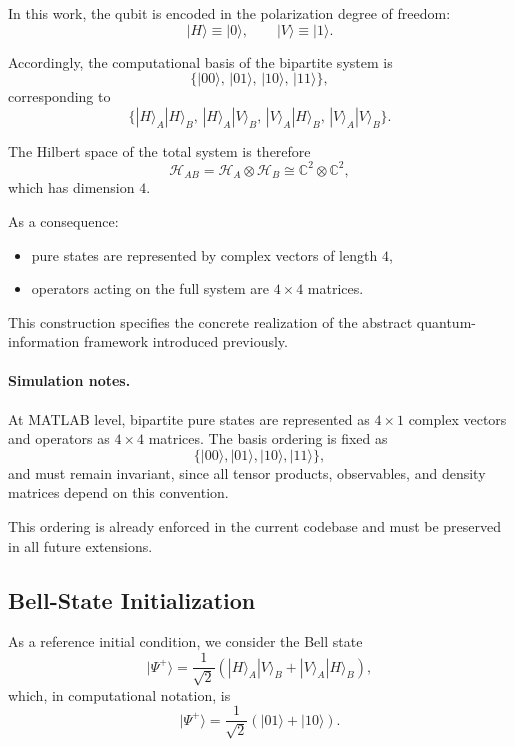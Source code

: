\documentclass[a4paper]{article}
\begin{document}
In this work, the qubit is encoded in the polarization degree of freedom:
\[
|H\rangle \equiv |0\rangle,
\qquad
|V\rangle \equiv |1\rangle.
\]

Accordingly, the computational basis of the bipartite system is
\[
\{
|00\rangle,\,
|01\rangle,\,
|10\rangle,\,
|11\rangle
\},
\]
corresponding to
\[
\{
|H\rangle_A |H\rangle_B,\,
|H\rangle_A |V\rangle_B,\,
|V\rangle_A |H\rangle_B,\,
|V\rangle_A |V\rangle_B
\}.
\]

The Hilbert space of the total system is therefore
\[
\mathcal{H}_{AB} = \mathcal{H}_A \otimes \mathcal{H}_B
\cong \mathbb{C}^2 \otimes \mathbb{C}^2,
\]
which has dimension \(4\).

As a consequence:
\begin{itemize}
    \item pure states are represented by complex vectors of length \(4\),
    \item operators acting on the full system are \(4 \times 4\) matrices.
\end{itemize}

This construction specifies the concrete realization of the abstract quantum-information framework introduced previously.

\paragraph{Simulation notes.}
At MATLAB level, bipartite pure states are represented as \(4 \times 1\) complex vectors and operators as \(4 \times 4\) matrices. The basis ordering is fixed as
\[
\{|00\rangle,|01\rangle,|10\rangle,|11\rangle\},
\]
and must remain invariant, since all tensor products, observables, and density matrices depend on this convention.

This ordering is already enforced in the current codebase and must be preserved in all future extensions.


\subsection{Bell-State Initialization}

As a reference initial condition, we consider the Bell state
\[
|\Psi^{+}\rangle
=
\frac{1}{\sqrt{2}}
\left(
|H\rangle_A |V\rangle_B
+
|V\rangle_A |H\rangle_B
\right),
\]
which, in computational notation, is
\[
|\Psi^{+}\rangle
=
\frac{1}{\sqrt{2}}
\left(
|01\rangle + |10\rangle
\right).
\]
\end{document}
